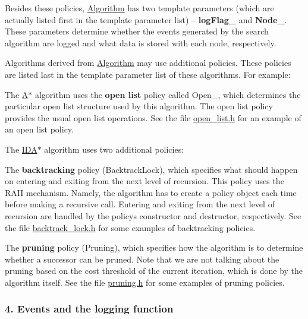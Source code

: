 Besides these policies, \hyperlink{structslb_1_1ext_1_1algorithm_1_1Algorithm}{Algorithm} has two template parameters (which are actually listed first in the template parameter list) -- {\bfseries log\+Flag\+\_\+} and {\bfseries Node\+\_\+}. These parameters determine whether the events generated by the search algorithm are logged and what data is stored with each node, respectively.

Algorithms derived from \hyperlink{structslb_1_1ext_1_1algorithm_1_1Algorithm}{Algorithm} may use additional policies. These policies are listed last in the template parameter list of these algorithms. For example\+:


\begin{DoxyItemize}
\item The \hyperlink{structslb_1_1ext_1_1algorithm_1_1Astar}{A$\ast$} algorithm uses the {\bfseries open list} policy called {\ttfamily Open\+\_\+}, which determines the particular open list structure used by this algorithm. The open list policy provides the usual open list operations. See the file \hyperlink{open__list_8h}{open\+\_\+list.\+h} for an example of an open list policy.
\item The \hyperlink{structslb_1_1ext_1_1algorithm_1_1IdAstar}{I\+D\+A$\ast$} algorithm uses two additional policies\+:
\begin{DoxyItemize}
\item The {\bfseries backtracking} policy ({\ttfamily Backtrack\+Lock}), which specifies what should happen on entering and exiting from the next level of recursion. This policy uses the R\+A\+II mechanism. Namely, the algorithm has to create a policy object each time before making a recursive call. Entering and exiting from the next level of recursion are handled by the policy\textquotesingle{}s constructor and destructor, respectively. See the file \hyperlink{backtrack__lock_8h}{backtrack\+\_\+lock.\+h} for some examples of backtracking policies.
\item The {\bfseries pruning} policy ({\ttfamily Pruning}), which specifies how the algorithm is to determine whether a successor can be pruned. Note that we are not talking about the pruning based on the cost threshold of the current iteration, which is done by the algorithm itself. See the file \hyperlink{pruning_8h}{pruning.\+h} for some examples of pruning policies.
\end{DoxyItemize}
\end{DoxyItemize}\hypertarget{index_s-events}{}\subsubsection{4. Events and the logging function}\label{index_s-events}
